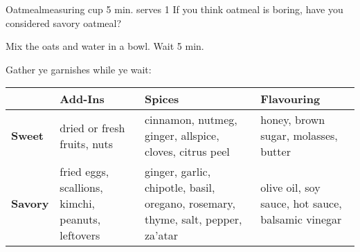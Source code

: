 \begin{recipe}{Oatmeal}{measuring cup \hfill 5 min.}{ \hfill serves 1}
 \freeform If you think oatmeal is boring, have you considered savory oatmeal?

 Mix the oats and water in a bowl. Wait 5 min.

 \freeform Gather ye garnishes while ye wait:
 \begin{center}
  \begin{tabular}{>{\centering\arraybackslash}m{}*{3}{|>{\centering\arraybackslash}m{0.25\textwidth}}}
                   & \textbf{Add-Ins}                                  & \textbf{Spices}                                                         & \textbf{Flavouring}                               \\
   \hline
   \textbf{Sweet}  & dried or fresh fruits, nuts                       & cinnamon, nutmeg, ginger, allspice, cloves, citrus peel                 & honey, brown sugar, molasses, butter              \\
   \hline
   \textbf{Savory} & fried eggs, scallions, kimchi, peanuts, leftovers & ginger, garlic, chipotle, basil, oregano, rosemary, thyme, salt, pepper, za'atar & olive oil, soy sauce, hot sauce, balsamic vinegar \\
  \end{tabular}
 \end{center}
\end{recipe}
